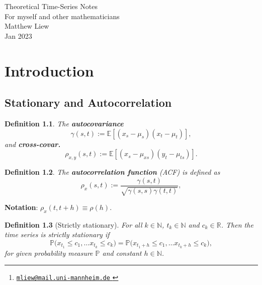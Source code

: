 \documentclass[10pt,titlepage,oneside,openany]{report}
\title{}
\author[1]{Matthew Liew\thanks{\href{mailto:mliew@mail.uni-mannheim.de}{\nolinkurl{mliew@mail.uni-mannheim.de} }}}
\theoremstyle{remark}
\theoremstyle{plain}
\newtheorem{Definition}{Definition}[section]
\newcommand{\R}{\mathbb{R}}
\newcommand{\N}{\mathbb{N}}
\numberwithin{equation}{section}
\renewcommand{\leq}{\leqslant}
\begin{document}
	
	\begin{titlepage}
		\vspace*{1cm}
		\begin{center}
			{\Large Theoretical Time-Series Notes}\\
			\vspace{0.25cm} 
			{For myself and other mathematicians}\\
			\vspace{6cm}
			{Matthew Liew}\\
			\vspace{5cm}
			{Jan 2023}
			
		\end{center}
	\end{titlepage} 
	
	\clearpage


\chapter{Introduction}\label{intro_thesis}



\section{Stationary and Autocorrelation}

\begin{Definition}
	The \textbf{autocovariance} $$\gamma (s,t) := \mathds{E} \left[(x_s - \mu_s) (x_t-\mu_t)\right],$$ and \textbf{cross-covar.} $$\rho_{x,y}(s,t):= \mathds{E}\left[(x_s - \mu_{xs})(y_t - \mu_{ts})\right].$$
\end{Definition}

\begin{Definition}
	The \textbf{autocorrelation function} (ACF) is defined as
	\[
		\rho_{x} (s,t)  := \frac{\gamma(s,t)}{\sqrt{\gamma(s,s)\gamma(t,t)}},
	\]
\end{Definition}

\textbf{Notation}: $\rho_{x}(t, t+h)  \equiv \rho(h)$.

\begin{Definition}[Strictly stationary]
	For all $k \in \N$, $t_k \in \N$ and $c_k \in \R$. Then the time series is strictly stationary if
		\[
		\mathds{P} \big(x_{t_1} \leq c_1, \dots x_{t_k} \leq c_k \big) = \mathds{P} \big(x_{t_1+h} \leq c_1, \dots x_{t_k+h} \leq c_k \big),
		\]
		for given probability measure $\mathds{P}$ and constant $h \in \N$.
\end{Definition}
\clearpage
\end{document}
